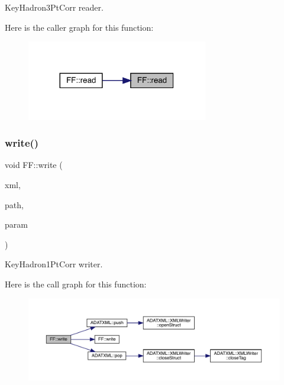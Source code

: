 Key\+Hadron3\+Pt\+Corr reader. 

Here is the caller graph for this function\+:\nopagebreak
\begin{figure}[H]
\begin{center}
\leavevmode
\includegraphics[width=224pt]{d5/da6/namespaceFF_a257b587cc1107da7cde8c3d17ea5ce50_icgraph}
\end{center}
\end{figure}
\mbox{\label{namespaceFF_a831b58b450a964b114e0fce65fc4de99}} 
\subsubsection{\texorpdfstring{write()}{write()}\hspace{0.1cm}{\footnotesize\ttfamily [1/13]}}
{\footnotesize\ttfamily void F\+F\+::write (\begin{DoxyParamCaption}\item[{X\+M\+L\+Writer \&}]{xml,  }\item[{const std\+::string \&}]{path,  }\item[{const \mbox{\hyperlink{structFF_1_1DiscoKeyOperator__t}{Disco\+Key\+Operator\+\_\+t}} \&}]{param }\end{DoxyParamCaption})}



Key\+Hadron1\+Pt\+Corr writer. 

Here is the call graph for this function\+:
\nopagebreak
\begin{figure}[H]
\begin{center}
\leavevmode
\includegraphics[width=350pt]{d5/da6/namespaceFF_a831b58b450a964b114e0fce65fc4de99_cgraph}
\end{center}
\end{figure}
\mbox{\label{namespaceFF_a941e3f6fd9d8acd3d0c6b1f03c4be71b}} 
